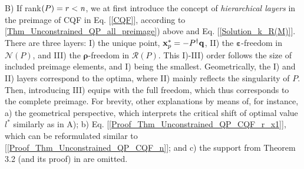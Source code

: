 \documentclass[9pt,twocolumn,twoside,lineno]{pnas-new-1}
\newcommand{\bfx}{{\bf x}}
\newcommand{\bfq}{{\bf q}}
\newcommand{\bfrho}{{\boldsymbol \rho}}
\newcommand{\bfvarepsilon}{{\boldsymbol \varepsilon}}
\newcommand{\calN}{{\mathcal N}}
\newcommand{\calR}{{\mathcal R}}
\newcommand{\itn}{{\it n}}
\theoremstyle{remark}
\begin{document}
\noindent B) If rank$(P)=r<\itn$, we at first introduce the concept of \textit{hierarchical layers} in the preimage of CQF in Eq. [\ref{CQF}], according to \ref{Thm_Unconstrained_QP_all_preimage}) above and Eq. [\ref{Solution_k_R(M)}]. There are three layers: I) the unique point, $\bfx_p^*=-P^\dagger\bfq$, II) the $\bfvarepsilon$-freedom in $\calN(P)$, and III) the $\bfrho$-freedom in $\calR(P)$. This I)-III) order follows the size of included preimage elements, and I) being the smallest. Geometrically, the I) and II) layers correspond to the optima, where II) mainly reflects the singularity of $P$. Then, introducing III) equips with the full freedom, which thus corresponds to the complete preimage. For brevity, other explanations by means of, for instance, a) the geometrical perspective, which interprets the critical shift of optimal value $l^*$ similarly as in A); b) Eq. [\ref{Proof_Thm_Unconstrained_QP_CQF_r_x1}], which can be reformulated similar to [\ref{Proof_Thm_Unconstrained_QP_CQF_n}]; and c) the support from Theorem 3.2 (and its proof) in \cite{LiLiHs:20} are omitted.
\end{document}
